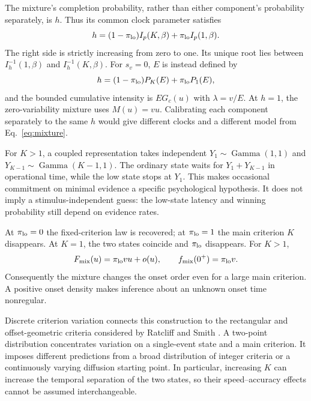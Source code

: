 \documentclass[12pt]{article}
\newcommand{\GammaDist}{\operatorname{Gamma}}
\theoremstyle{definition}
\theoremstyle{plain}
\theoremstyle{remark}
\begin{document}
The mixture's completion probability, rather than either component's probability separately, is $h$. Thus its common clock parameter satisfies
\begin{equation}
 h=(1-\pi_{\rm lo})I_p(K,\beta)+\pi_{\rm lo}I_p(1,\beta).\label{eq:mixture-h}
\end{equation}
The right side is strictly increasing from zero to one. Its unique root lies between $I_h^{-1}(1,\beta)$ and $I_h^{-1}(K,\beta)$. For $s_v=0$, $E$ is instead defined by
\begin{equation}
 h=(1-\pi_{\rm lo})P_K(E)+\pi_{\rm lo}P_1(E),\label{eq:mixture-E}
\end{equation}
and the bounded cumulative intensity is $E G_c(u)$ with $\lambda=v/E$. At $h=1$, the zero-variability mixture uses $M(u)=vu$. Calibrating each component separately to the same $h$ would give different clocks and a different model from Eq.~\eqref{eq:mixture}.

For $K>1$, a coupled representation takes independent $Y_1\sim\GammaDist(1,1)$ and $Y_{K-1}\sim\GammaDist(K-1,1)$. The ordinary state waits for $Y_1+Y_{K-1}$ in operational time, while the low state stops at $Y_1$. This makes occasional commitment on minimal evidence a specific psychological hypothesis. It does not imply a stimulus-independent guess: the low-state latency and winning probability still depend on evidence rates.

At $\pi_{\rm lo}=0$ the fixed-criterion law is recovered; at $\pi_{\rm lo}=1$ the main criterion $K$ disappears. At $K=1$, the two states coincide and $\pi_{\rm lo}$ disappears. For $K>1$,
\begin{equation}
 F_{\rm mix}(u)=\pi_{\rm lo}vu+o(u),\qquad
 f_{\rm mix}(0^+)=\pi_{\rm lo}v.\label{eq:mixture-onset}
\end{equation}
Consequently the mixture changes the onset order even for a large main criterion. A positive onset density makes inference about an unknown onset time nonregular.

Discrete criterion variation connects this construction to the rectangular and offset-geometric criteria considered by Ratcliff and Smith \cite{RatcliffSmith2004}. A two-point distribution concentrates variation on a single-event state and a main criterion. It imposes different predictions from a broad distribution of integer criteria or a continuously varying diffusion starting point. In particular, increasing $K$ can increase the temporal separation of the two states, so their speed--accuracy effects cannot be assumed interchangeable.
\end{document}
